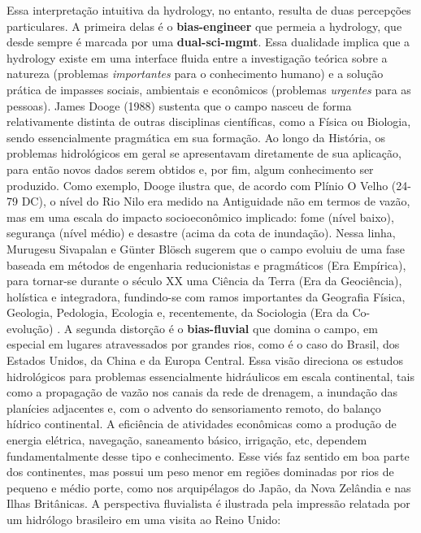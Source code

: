 \documentclass[./main.tex]{subfiles}
\begin{document}
\par Essa interpretação intuitiva da \gls{hydrology}, no entanto, resulta de duas percepções particulares. A primeira delas é o \textbf{\gls{bias-engineer}} que permeia a \gls{hydrology}, que desde sempre é marcada por uma \textbf{\gls{dual-sci-mgmt}}. Essa dualidade implica que a \gls{hydrology} existe em uma interface fluida entre a investigação teórica sobre a natureza (problemas \textit{importantes} para o conhecimento humano) e a solução prática de impasses sociais, ambientais e econômicos (problemas \textit{urgentes} para as pessoas). James Dooge (1988) \cite{Dooge1988} sustenta que o campo nasceu de forma relativamente distinta de outras disciplinas científicas, como a Física ou Biologia, sendo essencialmente pragmática em sua formação. Ao longo da História, os problemas hidrológicos em geral se apresentavam diretamente de sua aplicação, para então novos dados serem obtidos e, por fim, algum conhecimento ser produzido. Como exemplo, Dooge ilustra que, de acordo com Plínio O Velho (24-79 DC), o nível do Rio Nilo era medido na Antiguidade não em termos de vazão, mas em uma escala do impacto socioeconômico implicado: fome (nível baixo), segurança (nível médio) e desastre (acima da cota de inundação). Nessa linha, Murugesu Sivapalan e Günter Blösch sugerem que o campo evoluiu de uma fase baseada em métodos de engenharia reducionistas e pragmáticos (Era Empírica), para tornar-se durante o século XX uma Ciência da Terra (Era da Geociência), holística e integradora, fundindo-se com ramos importantes da Geografia Física, Geologia, Pedologia, Ecologia e, recentemente, da Sociologia (Era da Co-evolução) \cite{Sivapalan2017, Sivapalan2018}. A segunda distorção é o \textbf{\gls{bias-fluvial}} que domina o campo, em especial em lugares atravessados por grandes rios, como é o caso do Brasil, dos Estados Unidos, da China e da Europa Central. Essa visão direciona os estudos hidrológicos para problemas essencialmente hidráulicos em escala continental, tais como a propagação de vazão nos canais da rede de drenagem, a inundação das planícies adjacentes e, com o advento do sensoriamento remoto, do balanço hídrico continental. A eficiência de atividades econômicas como a produção de energia elétrica, navegação, saneamento básico, irrigação, etc, dependem fundamentalmente desse tipo e conhecimento. Esse viés faz sentido em boa parte dos continentes, mas possui um peso menor em regiões dominadas por rios de pequeno e médio porte, como nos arquipélagos do Japão, da Nova Zelândia e nas Ilhas Britânicas. A perspectiva fluvialista é ilustrada pela impressão relatada por um hidrólogo brasileiro em uma visita ao Reino Unido:
\end{document}
